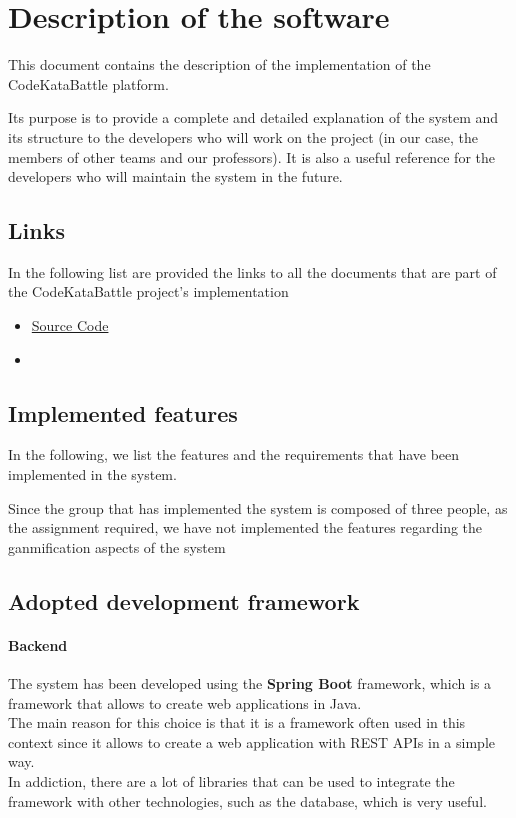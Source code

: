 \chapter{Description of the software}

This document contains the description of the implementation of the CodeKataBattle platform.

Its purpose is to provide a complete and detailed explanation of the system and its structure to the developers who will work on the project (in our case, the members of other teams and our professors). It is also a useful reference for the developers who will maintain the system in the future.

\section{Links}
In the following list are provided the links to all the documents that are part of the CodeKataBattle project's implementation

\begin{itemize}
    \item \href{https://github.com/pontig/sw-eng-2-PasiniPontiggiaStasi/tree/main/ITD/CodeKataBattle}{Source Code}
    \item {\color{red}{executable ready to be run}}
\end{itemize}

\section{Implemented features}

In the following, we list the features and the requirements that have been implemented in the system.

Since the group that has implemented the system is composed of three people, as the assignment required, we have not implemented the features regarding the ganmification aspects of the system

\section{Adopted development framework}

\subsubsection{Backend}
The system has been developed using the \textbf{Spring Boot} framework, which is a framework that allows to create web applications in Java.\\
The main reason for this choice is that it is a framework often used in this context since it allows to create a web application with REST APIs in a simple way.\\In addiction, there are a lot of libraries that can be used to integrate the framework with other technologies, such as the database, which is very useful.


